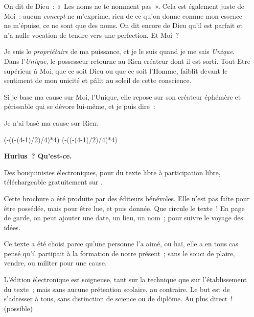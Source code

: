 \documentclass[french,twoside]{book} %
\def\truncdiv#1#2{((#1-(#2-1)/2)/#2)}
\def\moduloop#1#2{(#1-\truncdiv{#1}{#2}*#2)}
\def\modulo#1#2{\number\numexpr\moduloop{#1}{#2}\relax}
\begin{document}
On dit de Dieu : « Les noms ne te nomment pas ». Cela est également juste de Moi : aucun \emph{concept} ne m’exprime, rien de ce qu’on donne comme mon essence ne m’épuise, ce ne sont que des noms. On dit encore de Dieu qu’il est parfait et n’a nulle vocation de tendre vers une perfection. Et Moi ?\par
Je suis le \emph{propriétaire} de ma puissance, et je le suis quand je me sais \emph{Unique}. Dans l’\emph{Unique}, le possesseur retourne au Rien créateur dont il est sorti. Tout Etre supérieur à Moi, que ce soit Dieu ou que ce soit l’Homme, faiblit devant le sentiment de mon unicité et pâlit au soleil de cette conscience.\par
Si je base ma cause sur Moi, l’Unique, elle repose sur son créateur éphémère et périssable qui se dévore lui-même, et je puis dire :\par
Je n’ai basé ma cause sur Rien.
 


\ifbooklet
  \pagestyle{empty}
  \clearpage
  \ifnum\modulo{\value{page}}{4}=0 \hbox{}\newpage\hbox{}\newpage\fi
  \ifnum\modulo{\value{page}}{4}=1 \hbox{}\newpage\hbox{}\newpage\fi


  \hbox{}\newpage
  \ifodd\value{page}\hbox{}\newpage\fi
  {\centering\color{rubric}\bfseries\noindent\large
    Hurlus ? Qu’est-ce.\par
    \bigskip
  }
  \noindent Des bouquinistes électroniques, pour du texte libre à participation libre,
  téléchargeable gratuitement sur \href{https://hurlus.fr}{}.\par
  \bigskip
  \noindent Cette brochure a été produite par des éditeurs bénévoles.
  Elle n’est pas faîte pour être possédée, mais pour être lue, et puis donnée.
  Que circule le texte !
  En page de garde, on peut ajouter une date, un lieu, un nom ; pour suivre le voyage des idées.
  \par

  Ce texte a été choisi parce qu’une personne l’a aimé,
  ou haï, elle a en tous cas pensé qu’il partipait à la formation de notre présent ;
  sans le souci de plaire, vendre, ou militer pour une cause.
  \par

  L’édition électronique est soigneuse, tant sur la technique
  que sur l’établissement du texte ; mais sans aucune prétention scolaire, au contraire.
  Le but est de s’adresser à tous, sans distinction de science ou de diplôme.
  Au plus direct ! (possible)
  \par
\end{document}
